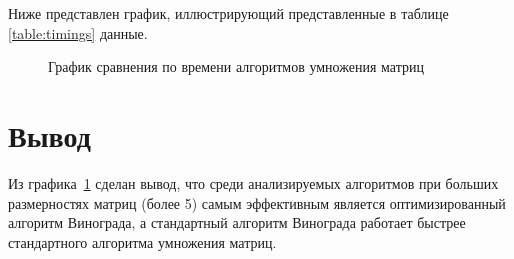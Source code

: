 Ниже представлен график, иллюстрирующий представленные в таблице \ref{table:timings} данные.

\begin{figure}[H]
	\centering
	
	\caption{График сравнения по времени алгоритмов умножения матриц}
	\label{plot:plot}
\end{figure}

\section*{Вывод}
Из графика~\ref{plot:plot} сделан вывод, что среди анализируемых алгоритмов при больших размерностях матриц (более 5) самым эффективным является оптимизированный алгоритм Винограда, а стандартный алгоритм Винограда работает быстрее стандартного алгоритма умножения матриц.


